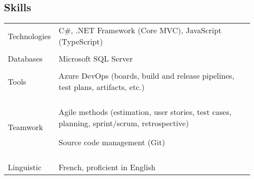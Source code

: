 \documentclass[11pt,a4paper]{article}
\begin{document}
\subsection*{Skills}
\noindent \begin{tabular}{@{}p{\annee}p{\texte}@{}}

Technologies &
C\#, .NET Framework (Core MVC), JavaScript (TypeScript) \\ \\

Databases &
Microsoft SQL Server \\ \\

Tools &
Azure DevOps (boards, build and release pipelines, test plans, artifacts, etc.) \\ \\

Teamwork &
Agile methods (estimation, user stories, test cases, planning, sprint/scrum, retrospective) \par
Source code management (Git) \\ \\

Linguistic &
French, proficient in English

\end{tabular}
\end{document}
